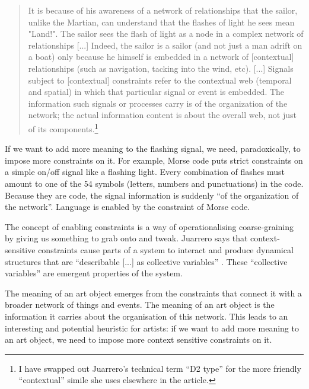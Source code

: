 \documentclass[letterpaper]{article}
\begin{document}
    \begin{quote}
        It is because of his awareness of a network of relationships that the sailor, unlike the Martian, can understand that the flashes of light he sees mean "Land!". The sailor sees the flash of light as a node in a complex network of relationships [...] Indeed, the sailor is a sailor (and not just a man adrift on a boat) only because he himself is embedded in a network of [contextual] relationships (such as navigation, tacking into the wind, etc). [...] Signals subject to [contextual] constraints refer to the contextual web (temporal and spatial) in which that particular signal or event is embedded. The information such signals or processes carry is of the organization of the network; the actual information content is about the overall web, not just of its components.\footnote{

            I have swapped out Juarrero's technical term “D2 type” for the more friendly “contextual” simile she uses elsewhere in the article.

        } \citep[p.237]{JuarreroCsltyAsCnstrnt1998}
    \end{quote}
    
    If we want to add more meaning to the flashing signal, we need, paradoxically, to impose more constraints on it. For example, Morse code puts strict constraints on a simple on/off signal like a flashing light. Every combination of flashes must amount to one of the 54 symbols (letters, numbers and punctuations) in the code. Because they are code, the signal information is suddenly “of the organization of the network”. Language is enabled by the constraint of Morse code.

    The concept of enabling constraints is a way of operationalising coarse-graining by giving us something to grab onto and tweak. Juarrero says that context-sensitive constraints cause parts of a system to interact and produce dynamical structures that are “describable [...] as collective variables” \citep[p.193]{JuarreroThSlfOrgnstnOfIntntnlActn2004}. These “collective variables” are emergent properties of the system.

    The meaning of an art object emerges from the constraints that connect it with a broader network of things and events. The meaning of an art object is the information it carries about the organisation of this network. This leads to an interesting and potential heuristic for artists: if we want to add more meaning to an art object, we need to impose more context sensitive constraints on it.
\end{document}
